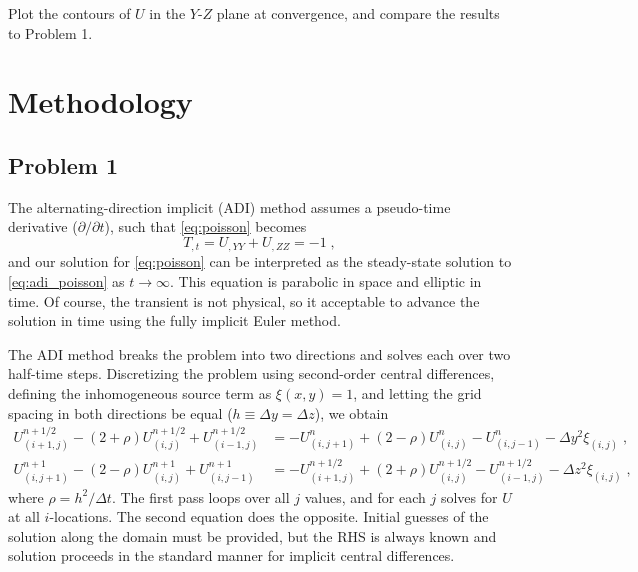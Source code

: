 \documentclass[11pt]{article}
\begin{document}
Plot the contours of $U$ in the $Y$-$Z$ plane at convergence, and compare the results to Problem 1.

\section{Methodology} %

\subsection{Problem 1}

The alternating-direction implicit (ADI) method assumes a pseudo-time derivative ($\partial/\partial t$), such that \eqref{eq:poisson} becomes
\begin{equation}
T_{,t} = U_{,YY} + U_{,ZZ} = -1
\;,
\label{eq:adi_poisson}
\end{equation}
and our solution for \eqref{eq:poisson} can be interpreted as the steady-state solution to \eqref{eq:adi_poisson} as $t \rightarrow \infty$. This equation is parabolic in space and elliptic in time. Of course, the transient is not physical, so it acceptable to advance the solution in time using the fully implicit Euler method.

The ADI method breaks the problem into two directions and solves each over two half-time steps. Discretizing the problem using second-order central differences, defining the inhomogeneous source term as $\xi(x,y) = 1$, and letting the grid spacing in both directions be equal ($h \equiv \Delta y = \Delta z$), we obtain
\begin{align}
U_{(i+1,j)}^{n+1/2} - (2 + \rho) U_{(i,j)}^{n+1/2} + U_{(i-1,j)}^{n+1/2}
&=
-U_{(i,j+1)}^{n} + (2 - \rho) U_{(i,j)}^{n} - U_{(i,j-1)}^{n} - \Delta y^2 \xi_{(i,j)}
\;, \\
U_{(i,j+1)}^{n+1} - (2 - \rho) U_{(i,j)}^{n+1} + U_{(i,j-1)}^{n+1}
&=
-U_{(i+1,j)}^{n+1/2} + (2 + \rho) U_{(i,j)}^{n+1/2} - U_{(i-1,j)}^{n+1/2} - \Delta z^2 \xi_{(i,j)}
\;,
\end{align}
where $\rho = h^2 / \Delta t$. The first pass loops over all $j$ values, and for each $j$ solves for $U$ at all $i$-locations. The second equation does the opposite. Initial guesses of the solution along the domain must be provided, but the RHS is always known and solution proceeds in the standard manner for implicit central differences.
\end{document}
